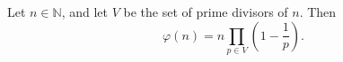 Let $n \in \mathbb{N}$, and let $V$ be the set of prime divisors of $n$. Then
$$\varphi(n) = n \prod_{p \in V} \left(1 - \frac{1}{p}\right).$$

